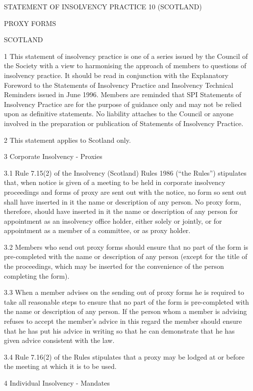 \documentclass[11pt,a4paper]{article}
\begin{document}
STATEMENT  OF  INSOLVENCY  PRACTICE  10  (SCOTLAND)

PROXY  FORMS

SCOTLAND

1	This statement of insolvency practice is one of a series issued by the Council of the Society with a view to harmonising the approach of members to questions of insolvency practice.  It should be read in conjunction with the Explanatory Foreword to the Statements of Insolvency Practice and Insolvency Technical Reminders issued in June 1996.  Members are reminded that SPI Statements of Insolvency Practice are for the purpose of guidance only and may not be relied upon as definitive statements.  No liability attaches to the Council or anyone involved in the preparation or publication of Statements of Insolvency Practice.

2	This statement applies to Scotland only.

3	Corporate Insolvency - Proxies

3.1	Rule 7.15(2) of the Insolvency (Scotland) Rules 1986 (“the Rules”) stipulates that, when notice is given of a meeting to be held in corporate insolvency proceedings and forms of proxy are sent out with the notice, no form so sent out shall have inserted in it the name or description of any person.  No proxy form, therefore, should have inserted in it the name or description of any person for appointment as an insolvency office holder, either solely or jointly, or for appointment as a member of a committee, or as proxy holder.

3.2	Members who send out proxy forms should ensure that no part of the form is pre-completed with the name or description of any person (except for the title of the proceedings, which may be inserted for the convenience of the person completing the form).

3.3	When a member advises on the sending out of proxy forms he is required to take all reasonable steps to ensure that no part of the form is pre-completed with the name or description of any person.  If the person whom a member is advising refuses to accept the member’s advice in this regard the member should ensure that he has put his advice in writing so that he can demonstrate that he has given advice consistent with the law.

3.4	Rule 7.16(2) of the Rules stipulates that a proxy may be lodged at or before the meeting at which it is to be used.

4	Individual Insolvency - Mandates
\end{document}
